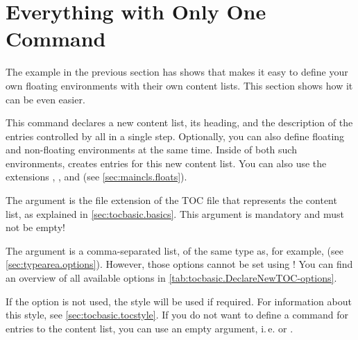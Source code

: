 \section{Everything with Only One Command}
\label{sec:tocbasic.declarenewtoc}

The example in the previous section has shows that  makes it
easy to define your own floating environments with their own content lists.
This section shows how it can be even easier.

\begin{Declaration}
\end{Declaration}
This command declares a new content list,
its heading, and the description of the entries controlled by
 all in a single step. Optionally, you can also define
floating and non-floating environments at the same time. Inside of both such
environments, %
 creates entries
for this new content list. You can also use the \KOMAScript{} extensions
, , and
 (see \autoref{sec:maincls.floats}).

The  argument is the file extension of the TOC file that
represents the content list, as explained in  \autoref{sec:tocbasic.basics}.
This argument is mandatory and must not be empty!

The  argument is a comma-separated list, of the same type as,
for example,  (see
\autoref{sec:typearea.options}). However, those options
cannot be set using !
You can find an overview of all available options in
\autoref{tab:tocbasic.DeclareNewTOC-options}.

If the 
option is not used, the  style will be used if required. For
information about this style, see \autoref{sec:tocbasic.tocstyle}. If you do
not want to define a command for entries to the content list, you can use an
empty argument, i.\,e.  or
.

